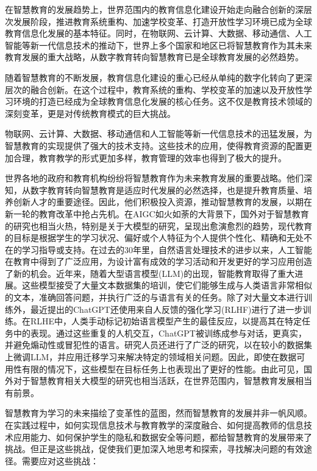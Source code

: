 \documentclass[oneside]{xduugthesis}
\begin{document}
在智慧教育的发展趋势上，世界范围内的教育信息化建设开始走向融合创新的深层次发展阶段，推进教育系统重构、加速学校变革、打造开放性学习环境已成为全球教育信息化发展的基本特征。同时，在物联网、云计算、大数据、移动通信、人工智能等新一代信息技术的推动下，世界上多个国家和地区已将智慧教育作为其未来教育发展的重大战略，从数字教育转向智慧教育已是全球教育发展的必然趋势\cite{杨现民2014我国智慧教育发展战略与路径选择}。

随着智慧教育的不断发展，教育信息化建设的重心已经从单纯的数字化转向了更深层次的融合创新。在这个过程中，教育系统的重构、学校变革的加速以及开放性学习环境的打造已经成为全球教育信息化发展的核心任务。这不仅是教育技术领域的深刻变革，更是对传统教育模式的巨大挑战。

物联网、云计算、大数据、移动通信和人工智能等新一代信息技术的迅猛发展，为智慧教育的实现提供了强大的技术支持。这些技术的应用，使得教育资源的配置更加合理，教育教学的形式更加多样，教育管理的效率也得到了极大的提升。

世界各地的政府和教育机构纷纷将智慧教育作为未来教育发展的重要战略。他们深知，从数字教育转向智慧教育是适应时代发展的必然选择，也是提升教育质量、培养创新人才的重要途径。因此，他们积极投入资源，推动智慧教育的发展，以期在新一轮的教育改革中抢占先机。在AIGC如火如荼的大背景下，国外对于智慧教育的研究也相当火热，特别是关于大模型的研究，呈现出愈演愈烈的趋势，现代教育的目标是根据学生的学习状况、偏好或个人特征为个人提供个性化、精确和无处不在的学习指导或支持。在过去的30年里，自然语言处理技术的进步以来，人工智能在教育中得到了广泛应用，为设计富有成效的学习活动和开发更好的学习应用创造了新的机会\cite{SSJD4F2AB8C4E9E116C7D1830AEB07853891}。近年来，随着大型语言模型(LLM)的出现，智能教育取得了重大进展。这些模型接受了大量文本数据集的培训，使它们能够生成与人类语言非常相似的文本，准确回答问题，并执行广泛的与语言有关的任务。除了对大量文本进行训练外，最近提出的ChatGPT还使用来自人反馈的强化学习(RLHF)\cite{SSJD4F2AB8C4E9E116C7D1830AEB07853891}进行了进一步训练。在RLHE中，人类手动标记初始语言模型产生的最佳反应，以提高其在特定任务中的表现。通过这些重复的人机交互，ChatGPT被训练成参与对话，更真实，并避免煽动性或冒犯性的语言。研究人员还进行了广泛的研究，以在较小的数据集上微调LLM，并应用迁移学习来解决特定的领域相关问题。因此，即使在数据可用性有限的情况下，这些模型在目标任务上也表现出了更好的性能。由此可见，国外对于智慧教育相关大模型的研究也相当活跃，在世界范围内，智慧教育发展相当有前景。

智慧教育为学习的未来描绘了变革性的蓝图，然而智慧教育的发展并非一帆风顺。在实践过程中，如何实现信息技术与教育教学的深度融合、如何提高教师的信息技术应用能力、如何保护学生的隐私和数据安全等问题，都给智慧教育的发展带来了挑战。但正是这些挑战，促使我们更加深入地思考和探索，寻找解决问题的有效途径。需要应对这些挑战：
\end{document}
